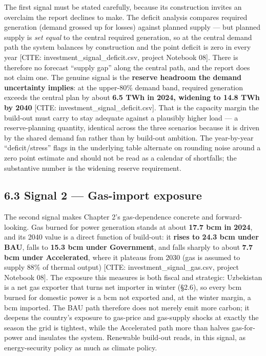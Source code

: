 \documentclass[10pt,twocolumn]{article}
\newcommand{\mk}[1]{{\color{amber}\small #1}}
\begin{document}
The first signal must be stated carefully, because its construction invites an overclaim the report declines to make. The deficit analysis compares required generation (demand grossed up for losses) against planned supply --- but planned supply is \textit{set equal} to the central required generation, so at the central demand path the system balances by construction and the point deficit is zero in every year \mk{[CITE: investment\_signal\_deficit.csv, project Notebook 08]}. There is therefore no forecast ``supply gap'' along the central path, and the report does not claim one. The genuine signal is the \textbf{reserve headroom the demand uncertainty implies}: at the upper-80\% demand band, required generation exceeds the central plan by about \textbf{6.5 TWh in 2024, widening to 14.8 TWh by 2040} \mk{[CITE: investment\_signal\_deficit.csv]}. That is the capacity margin the build-out must carry to stay adequate against a plausibly higher load --- a reserve-planning quantity, identical across the three scenarios because it is driven by the shared demand fan rather than by build-out ambition. The year-by-year ``deficit/stress'' flags in the underlying table alternate on rounding noise around a zero point estimate and should not be read as a calendar of shortfalls; the substantive number is the widening reserve requirement.

\subsection*{6.3 Signal 2 --- Gas-import exposure}

The second signal makes Chapter 2's gas-dependence concrete and forward-looking. Gas burned for power generation stands at about \textbf{17.7 bcm in 2024}, and its 2040 value is a direct function of build-out: it \textbf{rises to 24.3 bcm under BAU}, falls to \textbf{15.3 bcm under Government}, and falls sharply to about \textbf{7.7 bcm under Accelerated}, where it plateaus from 2030 (gas is assumed to supply 88\% of thermal output) \mk{[CITE: investment\_signal\_gas.csv, project Notebook 08]}. The exposure this measures is both fiscal and strategic: Uzbekistan is a net gas exporter that turns net importer in winter (\S{}2.6), so every bcm burned for domestic power is a bcm not exported and, at the winter margin, a bcm imported. The BAU path therefore does not merely emit more carbon; it deepens the country's exposure to gas-price and gas-supply shocks at exactly the season the grid is tightest, while the Accelerated path more than halves gas-for-power and insulates the system. Renewable build-out reads, in this signal, as energy-security policy as much as climate policy.
\end{document}
